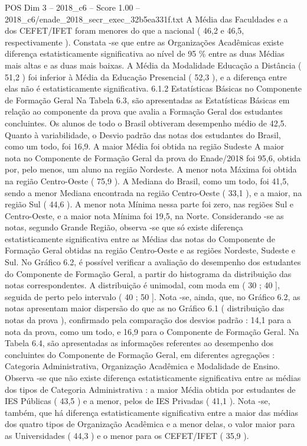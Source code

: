 \begin{textsample}{POS Dim 3 – 2018\_c6 – Score 1.00 – 2018\_c6/enade\_2018\_secr\_exec\_32b5ea331f.txt}
A Média das Faculdades e a dos CEFET/IFET foram menores do que a nacional ( 46,2 e 46,5, respectivamente ).
Constata -se que entre as Organizações Acadêmicas existe diferença estatisticamente significativa ao nível de 95 \% entre as duas Médias mais altas e as duas mais baixas.
A Média da Modalidade Educação a Distância ( 51,2 ) foi inferior à Média da Educação Presencial ( 52,3 ), e a diferença entre elas não é estatisticamente significativa. 6.1.2 Estatísticas Básicas no Componente de Formação Geral Na Tabela 6.3, são apresentadas as Estatísticas Básicas em relação ao componente da prova que avalia a Formação Geral dos estudantes concluintes.
Os alunos de todo o Brasil obtiveram desempenho médio de 42,5.
Quanto à variabilidade, o Desvio padrão das notas dos estudantes do Brasil, como um todo, foi 16,9.
A maior Média foi obtida na região Sudeste A maior nota no Componente de Formação Geral da prova do Enade/2018 foi 95,6, obtida por, pelo menos, um aluno na região Nordeste.
A menor nota Máxima foi obtida na região Centro-Oeste ( 75,9 ).
A Mediana do Brasil, como um todo, foi 41,5, sendo a menor Mediana encontrada na região Centro-Oeste ( 33,1 ), e a maior, na região Sul ( 44,6 ).
A menor nota Mínima nessa parte foi zero, nas regiões Sul e Centro-Oeste, e a maior nota Mínima foi 19,5, na Norte.
Considerando -se as notas, segundo Grande Região, observa -se que só existe diferença estatisticamente significativa entre as Médias das notas do Componente de Formação Geral obtidas na região Centro-Oeste e as regiões Nordeste, Sudeste e Sul.
No Gráfico 6.2, é possível verificar a avaliação do desempenho dos estudantes do Componente de Formação Geral, a partir do histograma da distribuição das notas correspondentes.
A distribuição é unimodal, com moda em ( 30 ; 40 ], seguida de perto pelo intervalo ( 40 ; 50 ].
Nota -se, ainda, que, no Gráfico 6.2, as notas apresentam maior dispersão do que as no Gráfico 6.1 ( distribuição das notas da prova ), confirmado pela comparação dos desvios padrão : 14,1 para a nota da prova, como um todo, e 16,9 para o Componente de Formação Geral.
Na Tabela 6.4, são apresentadas as informações referentes ao desempenho dos concluintes do Componente de Formação Geral, em diferentes agregações : Categoria Administrativa, Organização Acadêmica e Modalidade de Ensino.
Observa -se que não existe diferença estatisticamente significativa entre as médias dos tipos de Categoria Administrativa : a maior Média obtida por estudantes de IES Públicas ( 43,5 ) e a menor, pelos de IES Privadas ( 41,1 ).
Nota -se, também, que há diferença estatisticamente significativa entre a maior das médias dos quatro tipos de Organização Acadêmica e a menor delas, o valor maior para as Universidades ( 44,3 ) e o menor para os CEFET/IFET ( 35,9 ).

\end{textsample}
